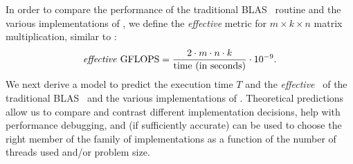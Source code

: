 


In order to compare the performance of the traditional BLAS \dgemm\ routine and the various implementations of
\strassen, we define the \emph{effective} \GFLOPS{} metric for
$m\times k \times n$ matrix multiplication, similar to \cite{StrassenBenson,PPL2,StrassenLipshitz}:
\begin{equation}
  \text{\emph{effective} GFLOPS} = \frac{2\cdot m\cdot n\cdot k}{\text{time (in seconds)}}\cdot 10 ^{-9}.
  \label{e:egflops1}
\end{equation}
We next derive a model to predict the execution time $T$ and the \emph{effective} \GFLOPS\ of the traditional
BLAS \dgemm\ and the various implementations of \strassen.  
Theoretical predictions allow us to compare and contrast different implementation decisions, help with 
performance debugging, and (if sufficiently accurate) can be used to 
choose the right member of the family of implementations as a function of the number of threads used and/or problem size.




